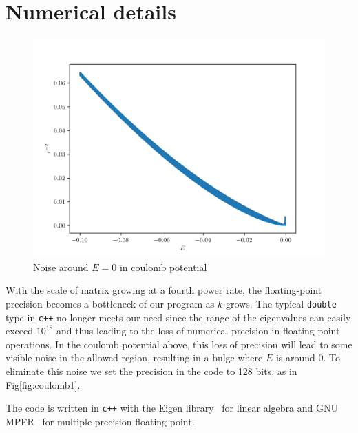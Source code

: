 \documentclass[aps, preprint,amsmath, amssymb]{revtex4-2}
\begin{document}
\appendix* 
	\section{Numerical details}
	\begin{figure}
		\includegraphics[width=0.8\linewidth]{noise.png}
		\caption{Noise around $E=0$ in coulomb potential}
	\end{figure}
	With the scale of matrix growing at a fourth power rate, the floating-point precision becomes a bottleneck of our program as $k$ grows. The typical \texttt{double} type in \texttt{c++} no longer meets our need since the range of the eigenvalues can easily exceed $10^{18}$ and thus leading to the loss of numerical precision in floating-point operations. In the coulomb potential above, this loss of precision will lead to some visible noise in the allowed region, resulting in a bulge where $E$ is around $0$. To eliminate this noise we set the precision in the code to 128 bits, as in Fig\ref{fig:coulomb1}.

	The code is written in \texttt{c++} with the Eigen library~\cite{eigenweb} for linear algebra and GNU MPFR~\cite{fousse2007mpfr} for multiple precision floating-point.
	


\end{document}
